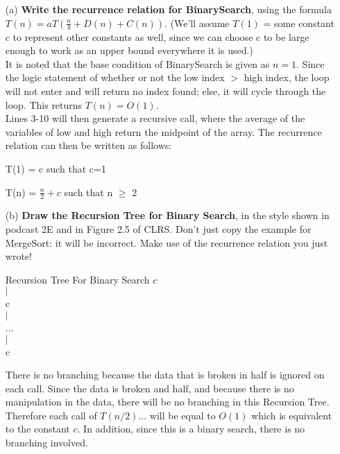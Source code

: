\documentclass[12pt]{article}
\begin{document}
\begin{itemize}
    \item[(a)] \textbf{Write the recurrence relation for BinarySearch}, using the formula $T(n)=aT(\frac{n}{b}+D(n)+C(n))$. (We'll assume $T(1)$ = some constant $c$ to represent other constants as well, since we can choose c to be large enough to work as an upper bound everywhere it is used.)\\
    \linebreak
It is noted that the base condition of BinarySearch is given as $n=1$. Since the logic statement of whether or not the low index $>$ high index, the loop will not enter and will return no index found; else, it will cycle through the loop. This returns $T(n) = O(1)$. \\
\linebreak
Lines 3-10 will then generate a recursive call, where the average of the variables of low and high return the midpoint of the array. The recurrence relation can then be written as follows: 
    \begin{center}
        T(1) = c such that c=1
    \end{center}
    \begin{center}
        T(n) = $\frac{n}{2} + c$ such that n $\geqslant$ 2
    \end{center}
    \linebreak
    \linebreak
    \item[(b)] \textbf{Draw the Recursion Tree for Binary Search}, in the style shown in podcast 2E and in Figure 2.5 of CLRS. Don't just copy the example for MergeSort: it will be incorrect. Make use of the recurrence relation you just wrote! \\
    \linebreak
    \begin{center}
    Recursion Tree For Binary Search
    \linebreak
     $c$ \\
    $|$ \\
    c \\
    $|$ \\
    ... \\
    $|$ \\
    c \\
     \end{center}
    There is no branching because the data that is broken in half is ignored on each call.
    Since the data is broken and half, and because there is no manipulation in the data, there will be no branching in this Recursion Tree. Therefore each call of $T(n/2)...$ will be equal to $O(1)$ which is equivalent to the constant $c$. In addition, since this is a binary search, there is  no branching involved. 

\end{itemize}
\end{document}
